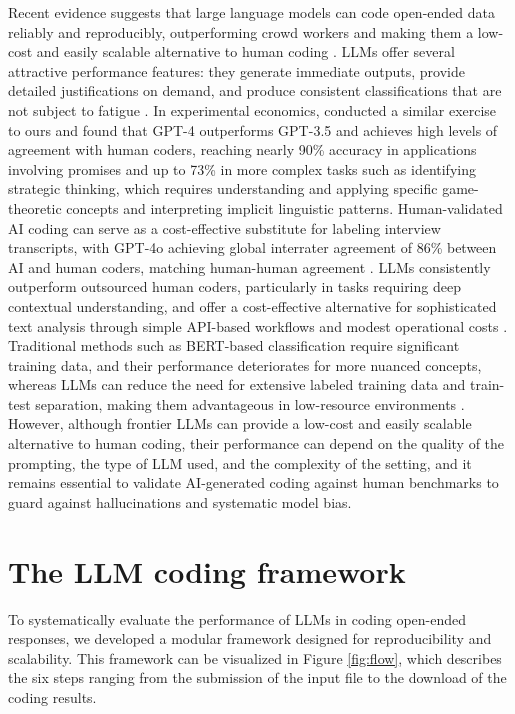 \documentclass[11pt]{article}
\begin{document}
\begin{sloppypar}
Recent evidence suggests that large language models can code open-ended data reliably and reproducibly, outperforming crowd workers and making them a low-cost and easily scalable alternative to human coding \citep{Bermejo2025, haaland2025understanding, Celebi2024}. LLMs offer several attractive performance features: they generate immediate outputs, provide detailed justifications on demand, and produce consistent classifications that are not subject to fatigue \citep{Celebi2024}. In experimental economics, \citet{Celebi2024} conducted a similar exercise to ours and found that GPT-4 outperforms GPT-3.5 and achieves high levels of agreement with human coders, reaching nearly 90\% accuracy in applications involving promises and up to 73\% in more complex tasks such as identifying strategic thinking, which requires understanding and applying specific game-theoretic concepts and interpreting implicit linguistic patterns. Human-validated AI coding can serve as a cost-effective substitute for labeling interview transcripts, with GPT-4o achieving global interrater agreement of 86\% between AI and human coders, matching human-human agreement \citep{ChopraHaaland2023}. LLMs consistently outperform outsourced human coders, particularly in tasks requiring deep contextual understanding, and offer a cost-effective alternative for sophisticated text analysis through simple API-based workflows and modest operational costs \citep{Bermejo2025}. Traditional methods such as BERT-based classification \citep{seiler2025measuring} require significant training data, and their performance deteriorates for more nuanced concepts, whereas LLMs can reduce the need for extensive labeled training data and train-test separation, making them advantageous in low-resource environments \citep{Bermejo2025}. However, although frontier LLMs can provide a low-cost and easily scalable alternative to human coding, their performance can depend on the quality of the prompting, the type of LLM used, and the complexity of the setting, and it remains essential to validate AI-generated coding against human benchmarks to guard against hallucinations and systematic model bias.



\section{The LLM coding framework}\label{s-methods}

To systematically evaluate the performance of LLMs in coding open-ended responses, we developed a modular framework designed for reproducibility and scalability. This framework can be visualized in Figure \ref{fig:flow}, which describes the six steps ranging from the submission of the input file to the download of the coding results.


\end{sloppypar}
\end{document}
